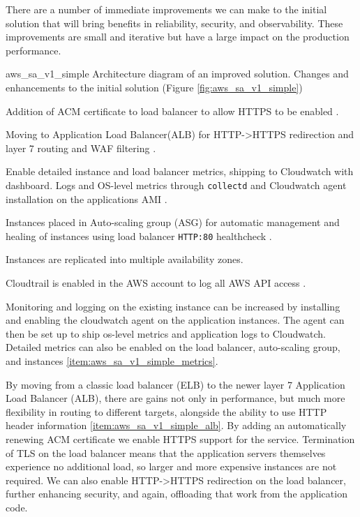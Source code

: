 

There are a number of immediate improvements we can make to the initial solution that will bring benefits in reliability, security, and observability. These improvements are small and iterative but have a large impact on the production performance. 

\architecture
{aws_sa_v1_simple}
{Architecture diagram of an improved solution.}
\changes
{Changes and enhancements to the initial solution (Figure \ref{fig:aws_sa_v1_simple})}
{
	\item \label{item:aws_sa_v1_simple_acm} Addition of ACM certificate to load balancer to allow HTTPS to be enabled \cite{acm-apiref}.
	\item \label{item:aws_sa_v1_simple_alb} Moving to Application Load Balancer(ALB) for HTTP->HTTPS redirection and layer 7 routing and WAF filtering \cite{elb-api}.
	\item \label{item:aws_sa_v1_simple_metrics} Enable detailed instance and load balancer metrics, shipping to Cloudwatch with dashboard. Logs and OS-level metrics through \texttt{collectd} and Cloudwatch agent installation on the applications AMI \cite{cwl-api}.
	\item \label{item:aws_sa_v1_simple_asg} Instances placed in Auto-scaling group (ASG) for automatic management and healing of instances using load balancer \texttt{HTTP:80} healthcheck \cite{as-api}. 
	\item \label{item:aws_sa_v1_simple_azs} Instances are replicated into multiple availability zones.
	\item \label{item:aws_sa_v1_simple_trail} Cloudtrail is enabled in the AWS account to log all AWS API access \cite{awscloudtrail-api}. 
}

\FloatBarrier


Monitoring and logging on the existing instance can be increased by installing and enabling the cloudwatch agent on the application instances. The agent can then be set up to ship os-level metrics and application logs to Cloudwatch. Detailed metrics can also be enabled on the load balancer, auto-scaling group, and instances \ref{item:aws_sa_v1_simple_metrics}. 



By moving from a classic load balancer (ELB) to the newer layer 7 Application Load Balancer (ALB), there are gains not only in performance, but much more flexibility in routing to different targets, alongside the ability to use HTTP header information \ref{item:aws_sa_v1_simple_alb}. By adding an automatically renewing ACM certificate we enable HTTPS support for the service. Termination of TLS on the load balancer means that the application servers themselves experience no additional load, so larger and more expensive instances are not required. We can also enable HTTP->HTTPS redirection on the load balancer, further enhancing security, and again, offloading that work from the application code. 

